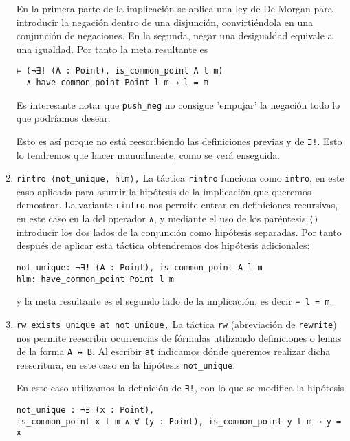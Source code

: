 \begin{enumerate}[label=L.\arabic*, topsep=0mm]
	      En la primera parte de la implicación se aplica una ley de De Morgan para
	      introducir la negación dentro de una disjunción, convirtiéndola en una
	      conjunción de negaciones. En la segunda, negar una desigualdad equivale a
	      una igualdad. Por tanto la meta resultante es
	      \begin{lstlisting}
⊢ (¬∃! (A : Point), is_common_point A l m) 
  ∧ have_common_point Point l m → l = m
\end{lstlisting}

	      Es interesante notar que \lstinline{push_neg} no consigue 'empujar' la negación todo lo que podríamos desear.

	      Esto es así porque no está reescribiendo las definiciones previas y de
	      \lstinline{∃!}. Esto lo tendremos que hacer manualmente, como se verá
	      enseguida.

	\item \lstinline{rintro ⟨not_unique, hlm⟩,} La táctica \lstinline{rintro}
	      funciona como \lstinline{intro}, en este caso aplicada para asumir la
	      hipótesis de la implicación que queremos demostrar. La variante
	      \lstinline{rintro} nos permite entrar en definiciones recursivas, en este
	      caso en la del operador \lstinline{∧}, y mediante el uso de los paréntesis
	      \lstinline{⟨⟩} introducir los dos lados de la conjunción como hipótesis
	      separadas. Por tanto después de aplicar esta táctica obtendremos dos
	      hipótesis adicionales:
	      \begin{lstlisting}
not_unique: ¬∃! (A : Point), is_common_point A l m
hlm: have_common_point Point l m
\end{lstlisting}
	      y la meta resultante es el segundo lado de la implicación, es decir
	      \lstinline{⊢ l = m}.

	\item \lstinline{rw exists_unique at not_unique,}  La táctica \lstinline{rw}
	      (abreviación de \lstinline{rewrite}) nos permite reescribir ocurrencias de
	      fórmulas utilizando definiciones o lemas de la forma \lstinline{A ↔ B}. Al
	      escribir \lstinline{at} indicamos dónde queremos realizar dicha
	      reescritura, en este caso en la hipótesis \lstinline{not_unique}.

	      En este caso utilizamos la definición de \lstinline{∃!}, con lo que se modifica la hipótesis
	      \begin{lstlisting}
not_unique : ¬∃ (x : Point), 
is_common_point x l m ∧ ∀ (y : Point), is_common_point y l m → y = x
\end{lstlisting}


\end{enumerate}
